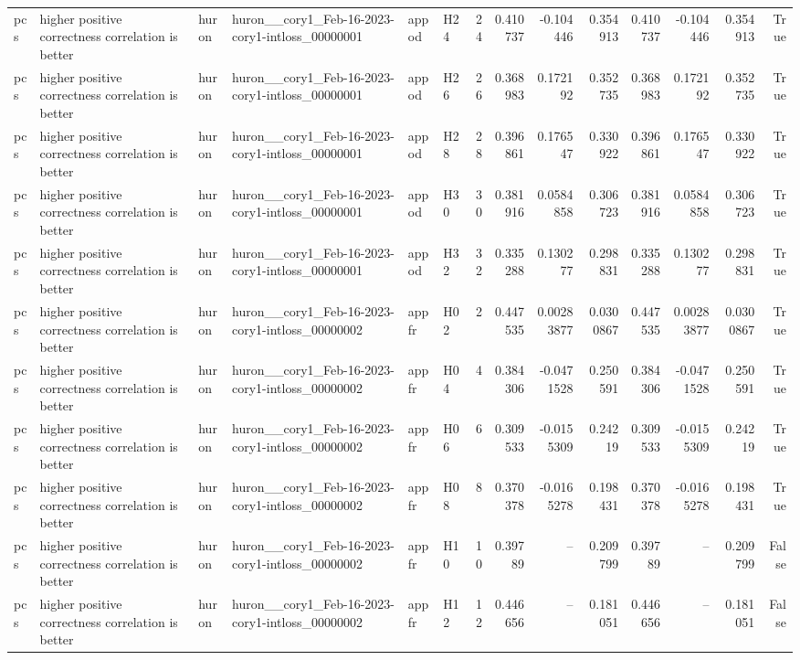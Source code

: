 \begin{longtable}{llllllrrrrrrrr}
pcs & higher positive correctness correlation is better & huron & huron\_\_cory1\_Feb-16-2023-cory1-intloss\_00000001 & appod & H24 & 24 & 0.410737 & -0.104446 & 0.354913 & 0.410737 & -0.104446 & 0.354913 & True \\
pcs & higher positive correctness correlation is better & huron & huron\_\_cory1\_Feb-16-2023-cory1-intloss\_00000001 & appod & H26 & 26 & 0.368983 & 0.172192 & 0.352735 & 0.368983 & 0.172192 & 0.352735 & True \\
pcs & higher positive correctness correlation is better & huron & huron\_\_cory1\_Feb-16-2023-cory1-intloss\_00000001 & appod & H28 & 28 & 0.396861 & 0.176547 & 0.330922 & 0.396861 & 0.176547 & 0.330922 & True \\
pcs & higher positive correctness correlation is better & huron & huron\_\_cory1\_Feb-16-2023-cory1-intloss\_00000001 & appod & H30 & 30 & 0.381916 & 0.0584858 & 0.306723 & 0.381916 & 0.0584858 & 0.306723 & True \\
pcs & higher positive correctness correlation is better & huron & huron\_\_cory1\_Feb-16-2023-cory1-intloss\_00000001 & appod & H32 & 32 & 0.335288 & 0.130277 & 0.298831 & 0.335288 & 0.130277 & 0.298831 & True \\
pcs & higher positive correctness correlation is better & huron & huron\_\_cory1\_Feb-16-2023-cory1-intloss\_00000002 & appfr & H02 & 2 & 0.447535 & 0.00283877 & 0.0300867 & 0.447535 & 0.00283877 & 0.0300867 & True \\
pcs & higher positive correctness correlation is better & huron & huron\_\_cory1\_Feb-16-2023-cory1-intloss\_00000002 & appfr & H04 & 4 & 0.384306 & -0.0471528 & 0.250591 & 0.384306 & -0.0471528 & 0.250591 & True \\
pcs & higher positive correctness correlation is better & huron & huron\_\_cory1\_Feb-16-2023-cory1-intloss\_00000002 & appfr & H06 & 6 & 0.309533 & -0.0155309 & 0.24219 & 0.309533 & -0.0155309 & 0.24219 & True \\
pcs & higher positive correctness correlation is better & huron & huron\_\_cory1\_Feb-16-2023-cory1-intloss\_00000002 & appfr & H08 & 8 & 0.370378 & -0.0165278 & 0.198431 & 0.370378 & -0.0165278 & 0.198431 & True \\
pcs & higher positive correctness correlation is better & huron & huron\_\_cory1\_Feb-16-2023-cory1-intloss\_00000002 & appfr & H10 & 10 & 0.39789 & -- & 0.209799 & 0.39789 & -- & 0.209799 & False \\
pcs & higher positive correctness correlation is better & huron & huron\_\_cory1\_Feb-16-2023-cory1-intloss\_00000002 & appfr & H12 & 12 & 0.446656 & -- & 0.181051 & 0.446656 & -- & 0.181051 & False \\

\end{longtable}

